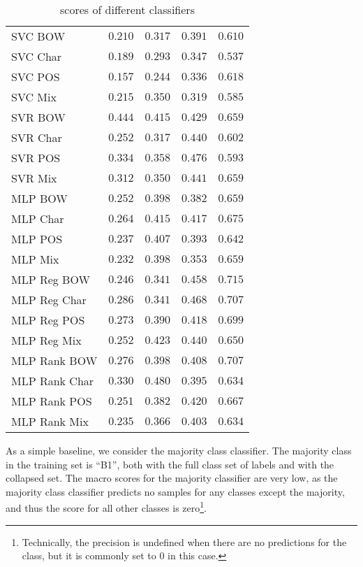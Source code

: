 \begin{table}
\begin{tabular}{lrrrr}
    \midrule
    SVC BOW & $0.210$ & $0.317$ & $0.391$ & $0.610$ \\
    SVC Char & $0.189$ & $0.293$ & $0.347$ & $0.537$ \\
    SVC POS & $0.157$ & $0.244$ & $0.336$ & $0.618$ \\
    SVC Mix & $0.215$ & $0.350$ & $0.319$ & $0.585$ \\
    \midrule
    SVR BOW & $\mathbf{0.444}$ & $0.415$ & $0.429$ & $0.659$ \\
    SVR Char & $0.252$ & $0.317$ & $0.440$ & $0.602$ \\
    SVR POS & $0.334$ & $0.358$ & $\mathbf{0.476}$ & $0.593$ \\
    SVR Mix & $0.312$ & $0.350$ & $0.441$ & $0.659$ \\
    \midrule
    MLP BOW & $0.252$ & $0.398$ & $0.382$ & $0.659$ \\
    MLP Char & $0.264$ & $0.415$ & $0.417$ & $0.675$ \\
    MLP POS & $0.237$ & $0.407$ & $0.393$ & $0.642$ \\
    MLP Mix & $0.232$ & $0.398$ & $0.353$ & $0.659$ \\
    \midrule
    MLP Reg BOW & $0.246$ & $0.341$ & $0.458$ & $\mathbf{0.715}$ \\
    MLP Reg Char & $0.286$ & $0.341$ & $0.468$ & $0.707$ \\
    MLP Reg POS & $0.273$ & $0.390$ & $0.418$ & $0.699$ \\
    MLP Reg Mix & $0.252$ & $0.423$ & $0.440$ & $0.650$ \\
    \midrule
    MLP Rank BOW & $0.276$ & $0.398$ & $0.408$ & $0.707$ \\
    MLP Rank Char & $0.330$ & $\mathbf{0.480}$ & $0.395$ & $0.634$ \\
    MLP Rank POS & $0.251$ & $0.382$ & $0.420$ & $0.667$ \\
    MLP Rank Mix & $0.235$ & $0.366$ & $0.403$ & $0.634$ \\
    \bottomrule
  \end{tabular}
  \caption{\FI scores of different classifiers}
  \label{tab:baseline-accuracies}
\end{table}

As a simple baseline, we consider the majority class classifier. The majority
class in the training set is ``B1'', both with the full class set of labels
and with the collapsed set. The macro \FI scores for the majority classifier
are very low, as the majority class classifier predicts no samples for any
classes except the majority, and thus the \FI score for all other classes is
zero\footnote{Technically, the precision is undefined when there are no
predictions for the class, but it is commonly set to 0 in this case.}.


